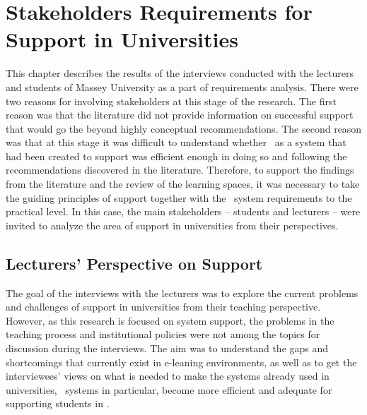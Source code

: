 \chapter{Stakeholders Requirements for \LLLc Support in Universities
\label{cha:model}}

This chapter describes the results of the interviews conducted with the
lecturers and students of Massey University as a part of \LLLs requirements
analysis. There were two reasons for involving stakeholders at this stage of the
research. The first reason was that the literature did not provide information
on successful \LLLs support that would go the beyond highly conceptual
recommendations. The second reason was that at this stage it was difficult to
understand whether \ep~as a system that had been created to support \LLLs was
efficient enough in doing so and following the recommendations discovered in the
literature. Therefore, to support the findings from the literature and the
review of the learning spaces, it was necessary to take the guiding principles
of \LLLs support together with the \ep~system requirements to the practical
level. In this case, the main stakeholders -- students and lecturers -- were
invited to analyze the area of \LLLs support in universities from their
perspectives.

\section{Lecturers' Perspective on \LLLc Support}

The goal of the interviews with the lecturers was to explore the current
problems and challenges of \LLLs support in universities from their teaching
perspective. However, as this research is focused on system support, the
problems in the teaching process and institutional policies were not among the
topics for discussion during the interviews. The aim was to understand the gaps
and shortcomings that currently exist in e-leaning environments, as well as to
get the interviewees' views on what is needed to make the systems already used
in universities, \ep~systems in particular, become more efficient and adequate
for supporting students in \LLLsn. 


